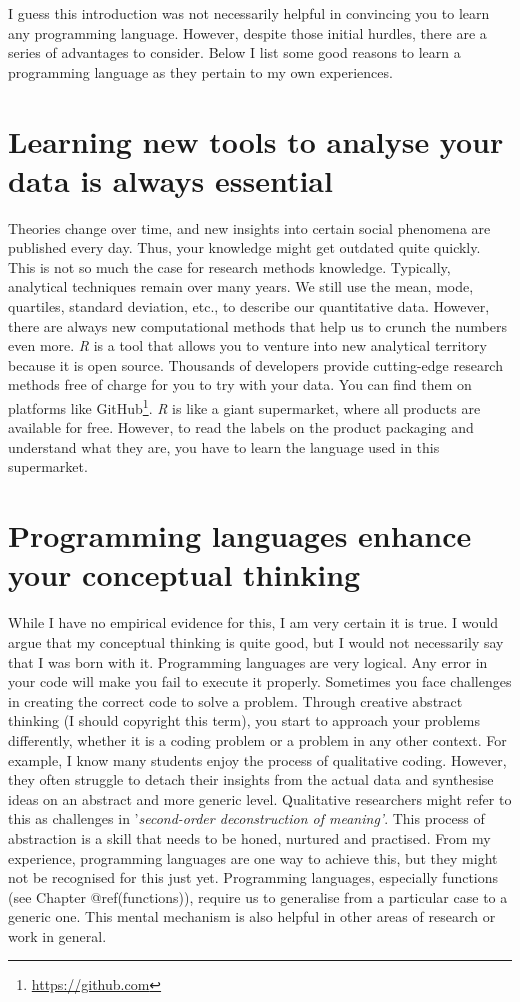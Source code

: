 \documentclass[
  letterpaper,
]{krantz}
\renewcommand{\href}[2]{#2\footnote{\url{#1}}}
\begin{document}
I guess this introduction was not necessarily helpful in convincing you
to learn any programming language. However, despite those initial
hurdles, there are a series of advantages to consider. Below I list some
good reasons to learn a programming language as they pertain to my own
experiences.

\section{Learning new tools to analyse your data is always
essential}\label{sec-learning-new-tools-to-analyse-your-data-is-always-essential}

Theories change over time, and new insights into certain social
phenomena are published every day. Thus, your knowledge might get
outdated quite quickly. This is not so much the case for research
methods knowledge. Typically, analytical techniques remain over many
years. We still use the mean, mode, quartiles, standard deviation, etc.,
to describe our quantitative data. However, there are always new
computational methods that help us to crunch the numbers even more.
\emph{R} is a tool that allows you to venture into new analytical
territory because it is open source. Thousands of developers provide
cutting-edge research methods free of charge for you to try with your
data. You can find them on platforms like
\href{https://github.com}{GitHub}. \emph{R} is like a giant supermarket,
where all products are available for free. However, to read the labels
on the product packaging and understand what they are, you have to learn
the language used in this supermarket.

\section{Programming languages enhance your conceptual
thinking}\label{sec-programming-languages-enhance-your-conceptual-thinking}

While I have no empirical evidence for this, I am very certain it is
true. I would argue that my conceptual thinking is quite good, but I
would not necessarily say that I was born with it. Programming languages
are very logical. Any error in your code will make you fail to execute
it properly. Sometimes you face challenges in creating the correct code
to solve a problem. Through creative abstract thinking (I should
copyright this term), you start to approach your problems differently,
whether it is a coding problem or a problem in any other context. For
example, I know many students enjoy the process of qualitative coding.
However, they often struggle to detach their insights from the actual
data and synthesise ideas on an abstract and more generic level.
Qualitative researchers might refer to this as challenges in
'\emph{second-order deconstruction of meaning'}. This process of
abstraction is a skill that needs to be honed, nurtured and practised.
From my experience, programming languages are one way to achieve this,
but they might not be recognised for this just yet. Programming
languages, especially functions (see Chapter @ref(functions)), require
us to generalise from a particular case to a generic one. This mental
mechanism is also helpful in other areas of research or work in general.
\end{document}
